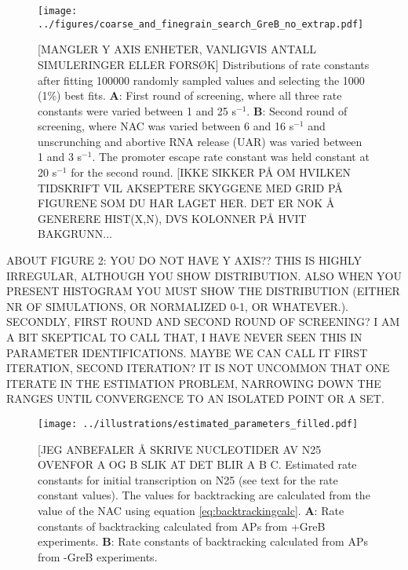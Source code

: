 \begin{figure}
	\begin{center}
      \texttt{[image: ../figures/coarse\_and\_finegrain\_search\_GreB\_no\_extrap.pdf]}
	\end{center}
    \caption{[MANGLER Y AXIS ENHETER, VANLIGVIS ANTALL SIMULERINGER ELLER FORSØK] Distributions of rate constants after fitting 100000 randomly
      sampled values and selecting the 1000 (1\%) best fits. \textbf{A}: First round
      of screening, where all three rate constants were varied between 1 and
      25 s$^{-1}$. \textbf{B}: Second round of screening, where NAC was varied
      between 6 and 16 s$^{-1}$ and unscrunching and abortive RNA release
      (UAR) was varied between 1 and 3 s$^{-1}$. The promoter escape rate
      constant was held constant at 20 s$^{-1}$ for the second round. [IKKE SIKKER PÅ OM HVILKEN TIDSKRIFT VIL AKSEPTERE SKYGGENE MED GRID PÅ FIGURENE SOM DU HAR LAGET HER. DET ER NOK Å GENERERE HIST(X,N), DVS KOLONNER PÅ HVIT BAKGRUNN...}
      \label{fig:parameter_estimation_proper}
\end{figure}
ABOUT FIGURE 2: YOU DO NOT HAVE Y AXIS?? THIS IS HIGHLY IRREGULAR, ALTHOUGH
YOU SHOW DISTRIBUTION. ALSO WHEN YOU PRESENT HISTOGRAM YOU MUST SHOW THE
DISTRIBUTION (EITHER NR OF SIMULATIONS, OR NORMALIZED 0-1, OR WHATEVER.).
SECONDLY, FIRST ROUND AND SECOND ROUND OF SCREENING? I AM A BIT SKEPTICAL TO
CALL THAT, I HAVE NEVER SEEN THIS IN PARAMETER IDENTIFICATIONS. MAYBE WE CAN
CALL IT FIRST ITERATION, SECOND ITERATION? IT IS NOT UNCOMMON THAT ONE ITERATE
IN THE ESTIMATION PROBLEM, NARROWING DOWN THE RANGES UNTIL CONVERGENCE TO AN
ISOLATED POINT OR A SET. 

\begin{figure}
	\begin{center}
      \texttt{[image: ../illustrations/estimated\_parameters\_filled.pdf]}
	\end{center}
    \caption{[JEG ANBEFALER Å SKRIVE NUCLEOTIDER AV N25 OVENFOR A OG B SLIK AT
            DET BLIR A B C. Estimated rate constants for initial transcription
            on N25 (see text for the rate constant values). The values for
            backtracking are calculated from the value of the NAC using
            equation \eqref{eq:backtrackingcalc}.  \textbf{A}: Rate constants
            of backtracking calculated from APs from +GreB experiments.
            \textbf{B}: Rate constants of backtracking calculated from APs
        from -GreB experiments.}
    \label{fig:estimated_parameters}
\end{figure}

